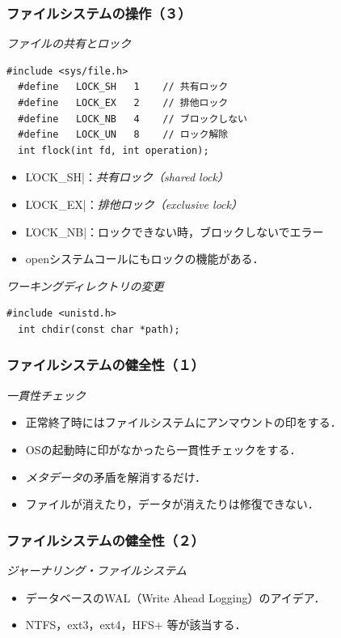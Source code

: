 \documentclass[unicode,handout]{beamer}                   %
\begin{document}
\begin{frame}[fragile]
  \frametitle{ファイルシステムの操作（３）}
  \emph{ファイルの共有とロック}
\begin{lstlisting}[numbers=none]
  #include <sys/file.h>
  #define   LOCK_SH   1    // 共有ロック
  #define   LOCK_EX   2    // 排他ロック
  #define   LOCK_NB   4    // ブロックしない
  #define   LOCK_UN   8    // ロック解除
  int flock(int fd, int operation);
\end{lstlisting}
  \begin{itemize}
  \item \|LOCK_SH|：\emph{共有ロック（shared lock）}
  \item \|LOCK_EX|：\emph{排他ロック（exclusive lock）}
  \item \|LOCK_NB|：ロックできない時，ブロックしないでエラー
  \item openシステムコールにもロックの機能がある．
  \end{itemize}
  \vfill

  \emph{ワーキングディレクトリの変更}
\begin{lstlisting}[numbers=none]
  #include <unistd.h>
  int chdir(const char *path);
\end{lstlisting}

  \vfill
\end{frame}

\begin{frame}
  \frametitle{ファイルシステムの健全性（１）}
  \emph{一貫性チェック}
  \begin{itemize}
  \item 正常終了時にはファイルシステムにアンマウントの印をする．
  \item OSの起動時に印がなかったら一貫性チェックをする．
  \item \emph{メタデータ}の矛盾を解消するだけ．
  \item ファイルが消えたり，データが消えたりは修復できない．
  \end{itemize}
  \vfill
\end{frame}

\begin{frame}
  \frametitle{ファイルシステムの健全性（２）}
  \emph{ジャーナリング・ファイルシステム}
  \vspace{3mm}
  \begin{itemize}
  \item データベースのWAL（Write Ahead Logging）のアイデア．
  \item NTFS，ext3，ext4，HFS+ 等が該当する．
  \end{itemize}
  \vfill
\end{frame}
\end{document}
